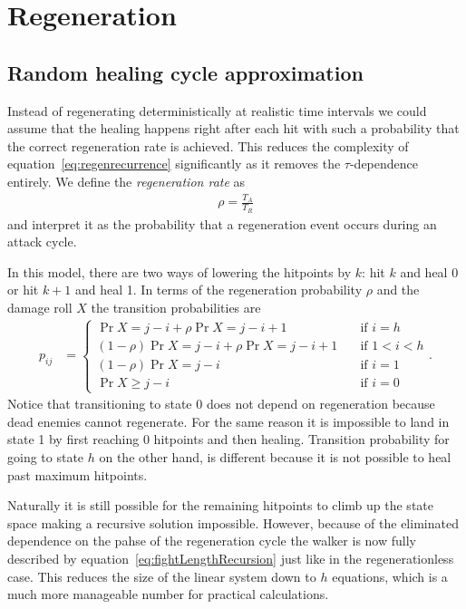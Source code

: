 \pagebreak
\section{Regeneration}\label{chap:regen}


\subsection{Random healing cycle approximation}
Instead of regenerating deterministically at realistic time intervals we could assume that the healing happens right after each hit with such a probability that the correct regeneration rate is achieved. This reduces the complexity of equation~\ref{eq:regenrecurrence} significantly as it removes the $\tau$-dependence entirely. We define the \emph{regeneration rate} as
\begin{align}\label{eq:regenProbability}
    \rho = \frac{T_A}{T_R}
\end{align}
and interpret it as the probability that a regeneration event occurs during an attack cycle.

In this model, there are two ways of lowering the hitpoints by $k$: hit $k$ and heal 0 or hit $k+1$ and heal 1. In terms of the regeneration probability $\rho$ and the damage roll $X$ the transition probabilities are
\begin{align}
    p_{ij}
         &= \begin{cases}
			 \Pr{X = j-i} + \rho \Pr{X = j-i+1} \quad &\mbox{if } i = h \\
            (1-\rho)\Pr{X = j-i} + \rho \Pr{X = j-i+1} \quad &\mbox{if } 1 < i < h \\
            (1-\rho)\Pr{X = j-i} \quad &\mbox{if } i = 1 \\
            \Pr{X \geq j-i} \quad &\mbox{if } i = 0
        \end{cases}\label{eq:damageDistributionRegen}.
\end{align}
Notice that transitioning to state 0 does not depend on regeneration because dead enemies cannot regenerate. For the same reason it is impossible to land in state 1 by first reaching 0 hitpoints and then healing. Transition probability for going to state $h$ on the other hand, is different because it is not possible to heal past maximum hitpoints.

Naturally it is still possible for the remaining hitpoints to climb up the state space making a recursive solution impossible. However, because of the eliminated dependence on the pahse of the regeneration cycle the walker is now fully described by equation~\ref{eq:fightLengthRecursion} just like in the regenerationless case. This reduces the size of the linear system down to $h$ equations, which is a much more manageable number for practical calculations.

